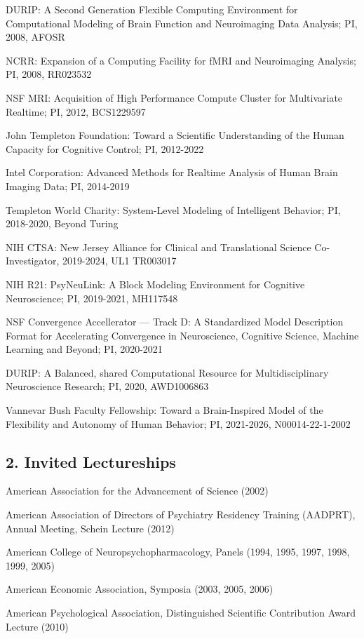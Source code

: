 \documentclass[10 pt]{article}
\begin{document}
DURIP:
A Second Generation Flexible Computing Environment for Computational Modeling of Brain Function and Neuroimaging
Data Analysis;
PI,
2008,
AFOSR

NCRR:
Expansion of a Computing Facility for fMRI and Neuroimaging Analysis;
PI,
2008,
RR023532

NSF MRI:
Acquisition of High Performance Compute Cluster for Multivariate Realtime;
PI,
2012,
BCS1229597

John Templeton Foundation:
Toward a Scientific Understanding of the Human Capacity for Cognitive Control;
PI,
2012-2022

Intel Corporation:
Advanced Methods for Realtime Analysis of Human Brain Imaging Data;
PI,
2014-2019

Templeton World Charity:
System-Level Modeling of Intelligent Behavior;
PI,
2018-2020,
Beyond Turing

NIH CTSA:
New Jersey Alliance for Clinical and Translational Science
Co-Investigator,
2019-2024,
UL1 TR003017

NIH R21:
PsyNeuLink: A Block Modeling Environment for Cognitive Neuroscience;
PI,
2019-2021,
MH117548

NSF Convergence Accellerator — Track D:
A Standardized Model Description Format for Accelerating Convergence in Neuroscience, Cognitive Science, Machine
Learning and Beyond;
PI,
2020-2021

DURIP:
A Balanced, shared Computational Resource for Multidisciplinary Neuroscience Research;
PI,
2020,
AWD1006863

Vannevar Bush Faculty Fellowship:
Toward a Brain-Inspired Model of the Flexibility and Autonomy of Human Behavior;
PI,
2021-2026,
N00014-22-1-2002


\subsection*{2. Invited Lectureships} \label{secRAPA2}

American Association for the Advancement of Science (2002)

American Association of Directors of Psychiatry Residency Training (AADPRT), Annual Meeting, Schein Lecture (2012)

American College of Neuropsychopharmacology, Panels (1994, 1995, 1997, 1998, 1999, 2005)

American Economic Association, Symposia (2003, 2005, 2006)

American Psychological Association, Distinguished Scientific Contribution Award Lecture (2010)
\end{document}
